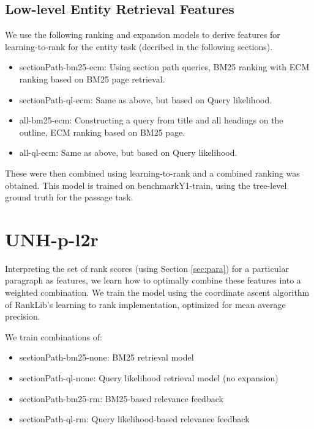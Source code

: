 \documentclass{article}
\begin{document}
\subsection{Low-level Entity Retrieval Features}
\label{sec:entity}


We  use the following ranking and expansion models to derive features for  learning-to-rank for the entity task (decribed in the following sections).


\begin{itemize}
\item sectionPath-bm25-ecm: Using section path queries, BM25 ranking with ECM ranking based on BM25 page retrieval.
\item sectionPath-ql-ecm: Same as above, but based on Query likelihood.
\item all-bm25-ecm: Constructing a query from title and all headings on the outline,  ECM ranking based on BM25 page.
\item all-ql-ecm: Same as above, but based on Query likelihood.

    \end{itemize}

These were then combined using  learning-to-rank and a combined ranking was obtained. 
This model is trained on benchmarkY1-train, using the tree-level ground truth for the passage task.    

\section{UNH-p-l2r}

Interpreting the set of rank scores (using Section \ref{sec:para}) for a particular paragraph as features, we learn how to optimally combine these features into a weighted combination. We train the model using the coordinate ascent algorithm of RankLib's learning to rank implementation, optimized for mean average precision. 

We train combinations of:
\begin{itemize}
    \item sectionPath-bm25-none: BM25 retrieval model
    \item sectionPath-ql-none: Query likelihood retrieval model (no expansion)
    \item sectionPath-bm25-rm: BM25-based relevance feedback
    \item sectionPath-ql-rm: Query likelihood-based relevance feedback
\end{itemize}
\end{document}
